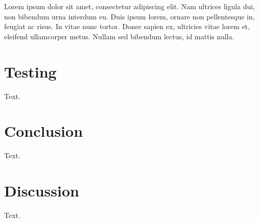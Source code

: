Lorem ipsum dolor sit amet, consectetur adipiscing elit. Nam ultrices ligula dui, non bibendum urna interdum eu. Duis ipsum lorem, ornare non pellentesque in, feugiat ac risus. In vitae nunc tortor. Donec sapien ex, ultricies vitae lorem et, eleifend ullamcorper metus. Nullam sed bibendum lectus, id mattis nulla.

\section{Testing}
Text.

\section{Conclusion}
Text.

\section{Discussion}
Text.